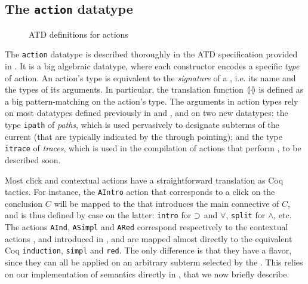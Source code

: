 \subsection{The \texttt{action} datatype}

\begin{figure}
  
  \caption{ATD definitions for actions}
\end{figure}

The \texttt{action} datatype is described thoroughly in the ATD specification
provided in . It is a big algebraic datatype, where each
constructor encodes a specific \emph{type} of action. An action's type is
equivalent to the \emph{signature} of a , i.e. its name and the types of
its arguments. In particular, the translation function $\llparenthesis \cdot \rrparenthesis$ is
defined as a big pattern-matching on the action's type. The arguments in action types rely
on most datatypes defined previously in  and ,
and on two new datatypes: the type \texttt{ipath} of \emph{paths}, which is used
pervasively to designate subterms of the current  (that are typically
indicated by the  through pointing); and the type \texttt{itrace}
of \emph{ traces}, which is used in the compilation of 
actions that perform , to be described soon.

Most click and contextual actions have a straightforward translation as Coq
tactics. For instance, the \texttt{AIntro} action that corresponds to a click on
the conclusion $C$ will be mapped to the   that introduces the main
connective of $C$, and is thus defined by case on the latter: \texttt{intro} for
$\supset$ and $\forall$, \texttt{split} for $\land$, etc. The actions
\texttt{AInd}, \texttt{ASimpl} and \texttt{ARed} correspond respectively to the
contextual actions ,  and 
introduced in , and are mapped almost directly to the equivalent
Coq  \texttt{induction}, \texttt{simpl} and \texttt{red}. The only
difference is that they have a \emph{} flavor, since they can all
be applied on an arbitrary subterm selected by the . This relies
on our implementation of  semantics directly in , that we now
briefly describe.

